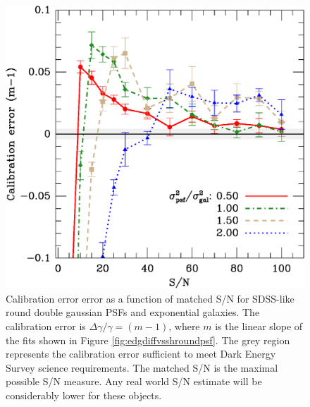 \documentclass[10pt,preprint]{aastex}
\newcommand{\psf}{PSF}
\begin{document}
\begin{figure}[t] \centering
 \centering 
 \includegraphics[scale=0.65]{figures/set-s2n-edg02-m-vs-shear.eps}

 \caption{Calibration error error as a function of matched S/N for SDSS-like
 round double gaussian \psf s and exponential galaxies.  The calibration error is
 $\Delta \gamma/\gamma = (m-1)$, where $m$ is the linear slope of the fits shown in
 Figure \ref{fig:edgdiffvsshroundpsf}.  The grey region represents the 
 calibration error sufficient to meet Dark Energy Survey science
 requirements.  The matched S/N is the maximal possible S/N measure.  Any real
 world S/N estimate will be considerably lower for these objects.} 

 \label{fig:edgcaliberr}

\end{figure}
\end{document}
